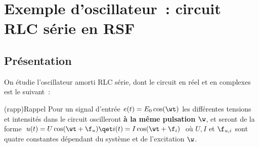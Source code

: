 \documentclass[../../main/main.tex]{subfiles}
\begin{document}
\section{Exemple d'oscillateur~: circuit RLC série en RSF}
\subsection{Présentation}

On étudie l'oscillateur amorti RLC série, dont le circuit en réel et en
complexes est le suivant~:
\begin{minipage}{\linewidth}
	\centering
	\vspace{-15pt}
\end{minipage}

\begin{tcb}(rapp){Rappel}
	Pour un signal d'entrée $e(t) = E_0 \cos(\wt)$ les différentes tensions et
	intensités dans le circuit oscilleront \textbf{à la même pulsation $\w$}, et
	seront de la forme $u(t) = U\cos(\wt+\f_u) \qet i(t) = I\cos(\wt+\f_i)$ où
	$U,I$ et $\f_{u,i}$ sont quatre constantes dépendant du système et de
	l'excitation $\w$.
\end{tcb}
\end{document}
